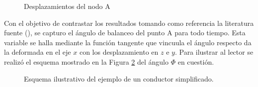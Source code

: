 \begingroup
\centering
\begin{figure}[htbp]
	\centering
	\label{fig:RN:FotiCable:DispZ}
	\label{fig:RN:FotiCable:DispY}
	\caption{Desplazamientos del nodo A} \label{fig:RN:FotiCable:DispsA}
\end{figure}
\endgroup


Con el objetivo de contrastar los resultados tomando como referencia la literatura fuente (\textcite{foti2018finite}), se capturo el ángulo de balanceo del punto $\text{A}$ para todo tiempo. Esta variable se halla mediante la función tangente que vincuula el ángulo respecto da la deformada en el eje $x$ con los desplazamiento en $z$ e $y$. Para ilustrar al lector se realizó el esquema mostrado en la Figura \ref{fig:RN:FotiCable:Angulo} del ángulo $\Phi$ en cuestión.

\begin{figure}[htbp]
	\centering
	\def\svgwidth{80mm}
	
	\caption{Esquema ilustrativo del ejemplo de un conductor simplificado.}
	\label{fig:RN:FotiCable:Angulo}
\end{figure}


